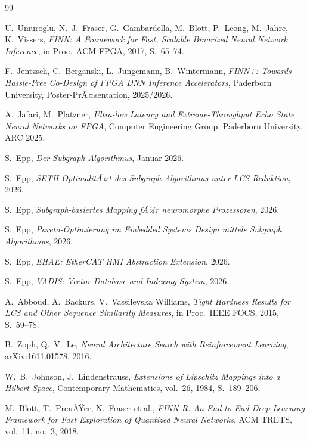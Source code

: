 ﻿\documentclass[a4paper,12pt]{article}
\theoremstyle{definition}
\begin{document}
\begin{thebibliography}{99}

  U.~Umuroglu, N.~J.~Fraser, G.~Gambardella, M.~Blott, P.~Leong, M.~Jahre, K.~Vissers,
  \textit{FINN: A Framework for Fast, Scalable Binarized Neural Network Inference},
  in Proc.\ ACM FPGA, 2017, S.~65--74.

  F.~Jentzsch, C.~Berganski, L.~Jungemann, B.~Wintermann,
  \textit{FINN+: Towards Hassle-Free Co-Design of FPGA DNN Inference Accelerators},
  Paderborn University, Poster-PrÃ¤sentation, 2025/2026.

  A.~Jafari, M.~Platzner,
  \textit{Ultra-low Latency and Extreme-Throughput Echo State Neural Networks on FPGA},
  Computer Engineering Group, Paderborn University, ARC 2025.

  S.~Epp,
  \textit{Der Subgraph Algorithmus}, Januar 2026.

  S.~Epp,
  \textit{SETH-OptimalitÃ¤t des Subgraph Algorithmus unter LCS-Reduktion}, 2026.

  S.~Epp,
  \textit{Subgraph-basiertes Mapping fÃ¼r neuromorphe Prozessoren}, 2026.

  S.~Epp,
  \textit{Pareto-Optimierung im Embedded Systems Design mittels Subgraph Algorithmus}, 2026.

  S.~Epp,
  \textit{EHAE: EtherCAT HMI Abstraction Extension}, 2026.

  S.~Epp,
  \textit{VADIS: Vector Database and Indexing System}, 2026.

  A.~Abboud, A.~Backurs, V.~Vassilevska Williams,
  \textit{Tight Hardness Results for LCS and Other Sequence Similarity Measures},
  in Proc.\ IEEE FOCS, 2015, S.~59--78.

  B.~Zoph, Q.~V.~Le,
  \textit{Neural Architecture Search with Reinforcement Learning},
  arXiv:1611.01578, 2016.

  W.~B.~Johnson, J.~Lindenstrauss,
  \textit{Extensions of Lipschitz Mappings into a Hilbert Space},
  Contemporary Mathematics, vol.~26, 1984, S.~189--206.

  M.~Blott, T.~PreuÃŸer, N.~Fraser et al.,
  \textit{FINN-R: An End-to-End Deep-Learning Framework for Fast Exploration
  of Quantized Neural Networks},
  ACM TRETS, vol.~11, no.~3, 2018.


\end{thebibliography}
\end{document}
